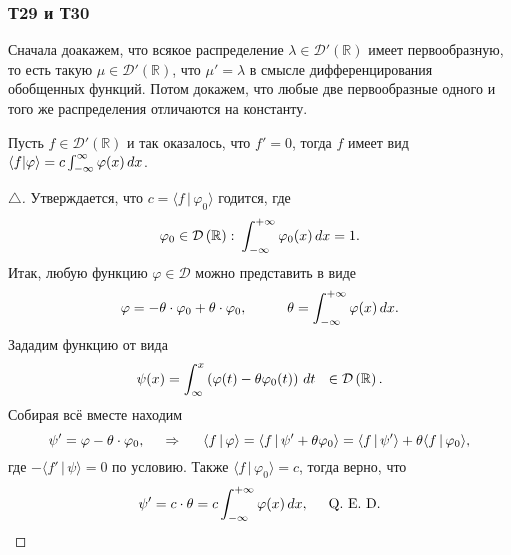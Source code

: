 


\subsubsection*{Т29 и Т30}


Сначала доакажем, что всякое распределение $\lambda \in \mathcal D'(\mathbb{R})$  имеет первообразную, то есть такую $\mu \in \mathcal D' (\mathbb{R})$, что $\mu' = \lambda$ в смысле дифференцирования обобщенных функций. Потом
докажем, что любые две первообразные одного и того же распределения отличаются на константу. 



\begin{to_lem}
    Пусть  $f \in \mathcal D' \left(\mathbb{R}\right)$ и так оказалось, что $f' =0$, тогда $f$ имеет вид $\langle f | \varphi \rangle = c \int_{-\infty}^{\infty} \varphi(x) \, d x$.
\end{to_lem}

\begin{proof}[$\triangle$]
    Утверждается, что $c = \langle f \,|\, \varphi_0 \rangle $ годится, где
    \begin{equation*}
        \varphi_0 \in \mathcal D \left(\mathbb{R}\right) \colon  
        \int_{-\infty}^{+\infty}  \varphi_0(x) \, d x = 1.
    \end{equation*}
    Итак, любую функцию $\varphi \in \mathcal D$ можно представить в виде
    \begin{equation*}
        \varphi = - \theta \cdot \varphi_0 + \theta \cdot \varphi_0,
        \hspace{10 mm} 
        \theta = \int_{-\infty}^{+\infty}  \varphi(x) \d x.
    \end{equation*}
    Зададим функцию от вида
    \begin{equation*}
        \psi(x) = \int_{\infty}^{x} \left(
            \varphi(t) - \theta \varphi_0 (t)
        \right) \, d t \ \ \in \mathcal D\left(\mathbb{R}\right).
    \end{equation*}
    Собирая всё вместе находим
    \begin{equation*}
        \psi' = \varphi - \theta \cdot \varphi_0,
        \hspace{0.5cm} \Rightarrow \hspace{0.5cm}
        \langle f \,|\, \varphi \rangle = \langle f \,|\, \psi' + \theta \varphi_0 \rangle = 
        \langle f \,|\, \psi' \rangle + \theta \langle f \,|\, \varphi_0 \rangle,
    \end{equation*}
    где $- \langle f' \,|\, \psi \rangle =0$ по условию. Также $\langle f \,|\, \varphi_0 \rangle  = c$, тогда верно, что
    \begin{equation*}
        \psi' = c \cdot \theta = c \int_{-\infty}^{+\infty}  \varphi(x) \, d x, 
        \hspace{5 mm} 
        \textnormal{Q. E. D.}
    \end{equation*}
\end{proof}


